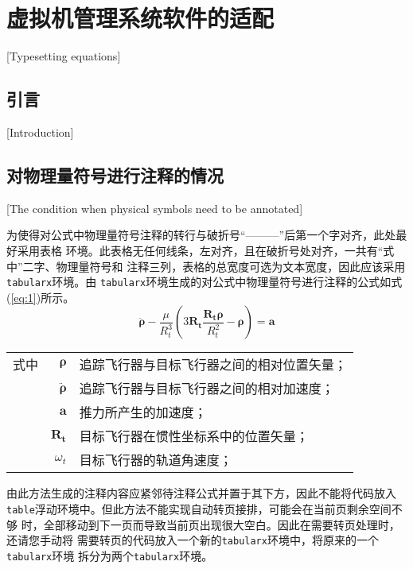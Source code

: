 
\chapter{虚拟机管理系统软件的适配}[Typesetting equations]

\section{引言}[Introduction]

\lipsum[1]

\section{对物理量符号进行注释的情况}[The condition when physical symbols
need to be annotated]

为使得对公式中物理量符号注释的转行与破折号“———”后第一个字对齐，此处最好采用表格
环境。此表格无任何线条，左对齐，且在破折号处对齐，一共有“式中”二字、物理量符号和
注释三列，表格的总宽度可选为文本宽度，因此应该采用\verb|tabularx|环境。由
\verb|tabularx|环境生成的对公式中物理量符号进行注释的公式如式(\ref{eq:1})所示。
\begin{equation}\label{eq:1}
\ddot{\bm{\rho}}-\frac{\mu}{R_{t}^{3}}\left(3\bm{R_{t}}\frac{\bm{R_{t}\rho}}{R_{t}^{2}}-\bm{\rho}\right)=\bm{a}
\end{equation}
\begin{tabularx}{\textwidth}{@{}l@{\quad}r@{———}X@{}}
式中& $\bm{\rho}$ &追踪飞行器与目标飞行器之间的相对位置矢量；\\
&  $\bm{\ddot{\rho}}$&追踪飞行器与目标飞行器之间的相对加速度；\\
&  $\bm{a}$   &推力所产生的加速度；\\
&  $\bm{R_t}$ & 目标飞行器在惯性坐标系中的位置矢量；\\
&  $\omega_{t}$ & 目标飞行器的轨道角速度；\\
\end{tabularx}\vspace{3.15bp}
由此方法生成的注释内容应紧邻待注释公式并置于其下方，因此不能将代码放入
\verb|table|浮动环境中。但此方法不能实现自动转页接排，可能会在当前页剩余空间不够
时，全部移动到下一页而导致当前页出现很大空白。因此在需要转页处理时，还请您手动将
需要转页的代码放入一个新的\verb|tabularx|环境中，将原来的一个\verb|tabularx|环境
拆分为两个\verb|tabularx|环境。

